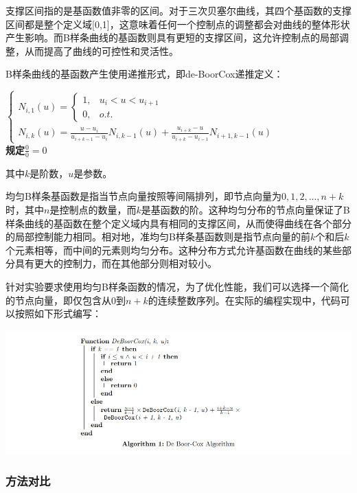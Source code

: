 \documentclass[a4paper,UTF8]{article}
\theoremstyle{definition}
\begin{document}
支撑区间指的是基函数值非零的区间。对于三次贝塞尔曲线，其四个基函数的支撑区间都是整个定义域[0,1]，这意味着任何一个控制点的调整都会对曲线的整体形状产生影响。而B样条曲线的基函数则具有更短的支撑区间，这允许控制点的局部调整，从而提高了曲线的可控性和灵活性。

B样条曲线的基函数产生使用递推形式，即de-BoorCox递推定义：

\begin{center}
	$
	\begin{cases}  
		N_{i,1}(u)=\begin{cases}
			1,	& u_i < u < u_{i+1}	\\
			0, 	& o.t.
		\end{cases} \\
		N_{i,k}(u)=\frac{u-u_i}{u_{i+k-1}-u_i}N_{i,k-1}(u)+\frac{u_{i+k}-u}{u_{i+k}-u_{i-1}}N_{i+1,k-1}(u)
	\end{cases} 
	$	\\
	\textbf{规定$\frac{0}{0}=0$}
\end{center}

其中$k$是阶数，$u$是参数。

均匀B样条基函数是指当节点向量按照等间隔排列，即节点向量为$0,1,2,...,n+k$时，其中$n$是控制点的数量，而$k$是基函数的阶。这种均匀分布的节点向量保证了B样条曲线的基函数在整个定义域内具有相同的支撑区间，从而使得曲线在各个部分的局部控制能力相同。相对地，准均匀B样条基函数则是指节点向量的前$k$个和后$k$个元素相等，而中间的元素则均匀分布。这种分布方式允许基函数在曲线的某些部分具有更大的控制力，而在其他部分则相对较小。

针对实验要求使用均匀B样条函数的情况，为了优化性能，我们可以选择一个简化的节点向量，即仅包含从$0$到$n+k$的连续整数序列。在实际的编程实现中，代码可以按照如下形式编写：

\begin{center}
	\includegraphics[width=6in]{figs/algorithm1.png}
\end{center}

\subsubsection{方法对比}
\end{document}
